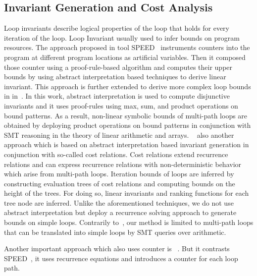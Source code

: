 \subsection{Invariant Generation and Cost Analysis} 
Loop invariants describe logical properties of the loop that holds for every iteration of the loop. Loop Invariant usually used to infer bounds on program resources.
The approach proposed in tool SPEED~\cite{speed1} instruments counters into the program at different program locations as artiﬁcial variables. Then it composed those counter using a proof-rule-based algorithm and computes their upper bounds by using abstract interpretation based techniques to derive linear invariant. This approach is further extended to derive more complex loop bounds in in~\cite{Gulwani:2010:RP:1806596.1806630}. In this work, 
abstract interpretation is used to compute disjunctive invariants and it uses proof-rules using max, sum, and product operations on bound patterns.
As a result, non-linear symbolic bounds of multi-path loops are obtained by deploying product operations on bound patterns in conjunction with SMT reasoning in the theory of linear arithmetic and arrays.  ~\cite{Albert:2011:CUB:1937961.1937986} also another approach which is based on abstract interpretation based invariant generation in conjunction with so-called cost relations. Cost relations extend recurrence relations and can express recurrence relations with non-deterministic behavior which arise from multi-path loops. Iteration bounds of loops are inferred by constructing evaluation trees of cost relations and computing bounds on the height of the trees. For doing so, linear invariants and ranking functions for each tree node are inferred. Unlike the aforementioned techniques, we do not use abstract interpretation but deploy a recurrence solving approach to generate bounds on simple loops. Contrarily to~\cite{speed1,Gulwani:2010:RP:1806596.1806630,Albert:2011:CUB:1937961.1937986}, our method is limited to multi-path loops that can be translated into simple loops by SMT queries over arithmetic.

Another important approach which also uses counter is ~\cite{Knoop:2011:SLB:2341512.2341532}. But it contrasts SPEED~\cite{speed1}, it uses recurrence equations and introduces a counter for each loop path. 

